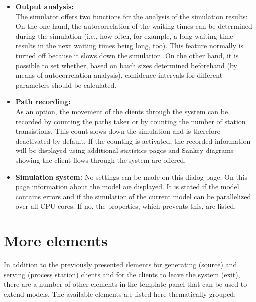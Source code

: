 \documentclass{svmono}
\begin{document}
\begin{itemize}
\item
\textbf{Output analysis:}\\
The simulator offers two functions for the analysis of the simulation results: On the one hand, the autocorrelation of the waiting times can be determined during the simulation (i.e., how often, for example, a long waiting time results in the next waiting times being long, too). This feature normally is turned off because it slows down the simulation. On the other hand, it is possible to set whether, based on batch sizes determined beforehand (by means of autocorrelation analysis), confidence intervals for different parameters should be calculated.
\item
\textbf{Path recording:}\\
As an option, the movement of the clients through the system can be recorded by counting the paths taken or by counting the number of station transistions.
This count slows down the simulation and is therefore deactivated by default. If the counting is activated, the recorded information will be displayed using additional
statistics pages and Sankey diagrams showing the client flows through the system are offered.
\item
\textbf{Simulation system:}
No settings can be made on this dialog page. On this page information about the model are displayed. It is stated if the model contains errors and if the simulation of the current model can be parallelized over all CPU cores. If no, the properties, which prevents this, are listed.

\end{itemize}

\chapter{More elements}

In addition to the previously presented elements for generating (source) and serving (process station) clients and for the clients to leave the system (exit), there are a number of other elements in the template panel that can be used to extend models. The available elements are listed here thematically grouped:
\end{document}

